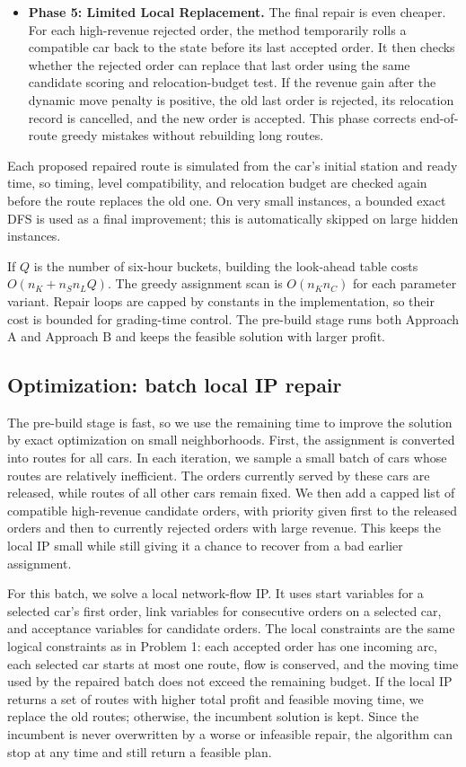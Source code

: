 \documentclass[10pt,a4paper]{article}
\begin{document}
\begin{itemize}
    \item \textbf{Phase 5: Limited Local Replacement.} The final repair is even
    cheaper.  For each high-revenue rejected order, the method temporarily rolls
    a compatible car back to the state before its last accepted order.  It then
    checks whether the rejected order can replace that last order using the same
    candidate scoring and relocation-budget test.  If the revenue gain after the
    dynamic move penalty is positive, the old last order is rejected, its
    relocation record is cancelled, and the new order is accepted.  This phase
    corrects end-of-route greedy mistakes without rebuilding long routes.
\end{itemize}

Each proposed repaired route is simulated from the car's initial station and
ready time, so timing, level compatibility, and relocation budget are checked
again before the route replaces the old one.  On very small instances, a bounded
exact DFS is used as a final improvement; this is automatically skipped on large
hidden instances.

If $Q$ is the number of six-hour buckets, building the look-ahead table costs
$O(n_K+n_Sn_LQ)$.  The greedy assignment scan is $O(n_Kn_C)$ for each parameter
variant.  Repair loops are capped by constants in the implementation, so their
cost is bounded for grading-time control.  The pre-build stage runs both
Approach A and Approach B and keeps the feasible solution with larger profit.

\subsection*{Optimization: batch local IP repair}

The pre-build stage is fast, so we use the remaining time to improve the
solution by exact optimization on small neighborhoods.  First, the assignment is
converted into routes for all cars.  In each iteration, we sample a small batch
of cars whose routes are relatively inefficient.  The orders currently served by
these cars are released, while routes of all other cars remain fixed.  We then
add a capped list of compatible high-revenue candidate orders, with priority
given first to the released orders and then to currently rejected orders with
large revenue.  This keeps the local IP small while still giving it a chance to
recover from a bad earlier assignment.

For this batch, we solve a local network-flow IP.  It uses start variables for a
selected car's first order, link variables for consecutive orders on a selected
car, and acceptance variables for candidate orders.  The local constraints are
the same logical constraints as in Problem 1: each accepted order has one
incoming arc, each selected car starts at most one route, flow is conserved, and
the moving time used by the repaired batch does not exceed the remaining budget.
If the local IP returns a set of routes with higher total profit and feasible
moving time, we replace the old routes; otherwise, the incumbent solution is
kept.  Since the incumbent is never overwritten by a worse or infeasible repair,
the algorithm can stop at any time and still return a feasible plan.
\end{document}
